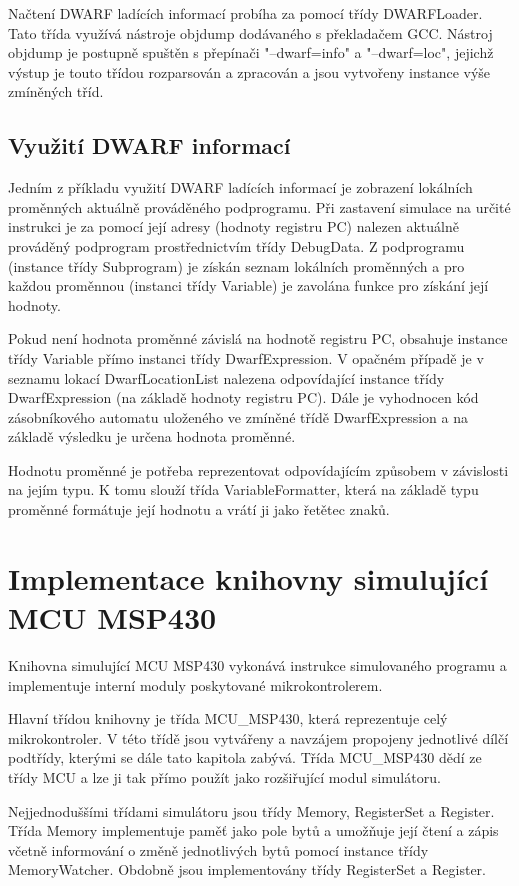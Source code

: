 Načtení DWARF ladících informací probíha za pomocí třídy DWARFLoader. Tato třída využívá nástroje objdump dodávaného s překladačem GCC. Nástroj objdump je postupně spuštěn s přepínači "--dwarf=info" a "--dwarf=loc", jejichž výstup je touto třídou rozparsován a zpracován a jsou vytvořeny instance výše zmíněných tříd.

\subsection{Využití DWARF informací}

Jedním z příkladu využití DWARF ladících informací je zobrazení lokálních proměnných aktuálně prováděného podprogramu. Při zastavení simulace na určité instrukci je za pomocí její adresy (hodnoty registru PC) nalezen aktuálně prováděný podprogram prostřednictvím třídy DebugData. Z podprogramu (instance třídy Subprogram) je získán seznam lokálních proměnných a pro každou proměnnou (instanci třídy Variable) je zavolána funkce pro získání její hodnoty.

Pokud není hodnota proměnné závislá na hodnotě registru PC, obsahuje instance třídy Variable přímo instanci třídy DwarfExpression. V opačném případě je v seznamu lokací DwarfLocationList nalezena odpovídající instance třídy DwarfExpression (na základě hodnoty registru PC). Dále je vyhodnocen kód zásobníkového automatu uloženého ve zmíněné třídě DwarfExpression a na základě výsledku je určena hodnota proměnné.

Hodnotu proměnné je potřeba reprezentovat odpovídajícím způsobem v závislosti na jejím typu. K tomu slouží třída VariableFormatter, která na základě typu proměnné formátuje její hodnotu a vrátí ji jako řetětec znaků.

\section{Implementace knihovny simulující MCU MSP430}

Knihovna simulující MCU MSP430 vykonává instrukce simulovaného programu a implementuje interní moduly poskytované mikrokontrolerem.

Hlavní třídou knihovny je třída MCU\_MSP430, která reprezentuje celý mikrokontroler. V této třídě jsou vytvářeny a navzájem propojeny jednotlivé dílčí podtřídy, kterými se dále tato kapitola zabývá. Třída MCU\_MSP430 dědí ze třídy MCU a lze ji tak přímo použít jako rozšiřující modul simulátoru.

Nejjednoduššími třídami simulátoru jsou třídy Memory, RegisterSet a Register. Třída Memory implementuje paměť jako pole bytů a umožňuje její čtení a zápis včetně informování o změně jednotlivých bytů pomocí instance třídy MemoryWatcher. Obdobně jsou implementovány třídy RegisterSet a Register.

